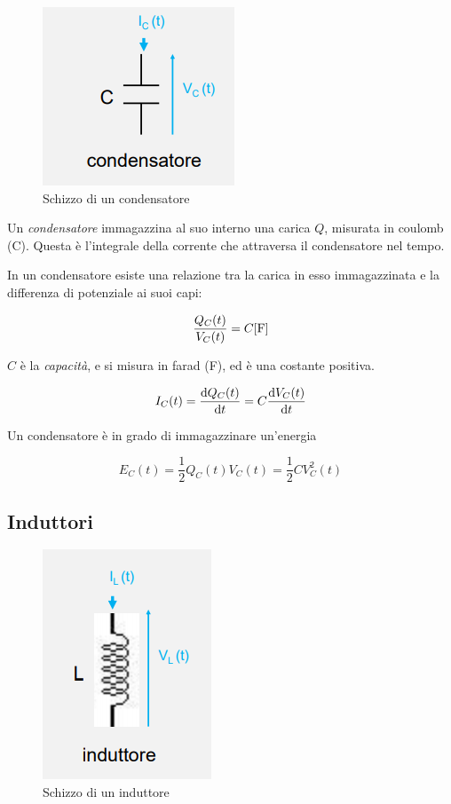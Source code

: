 \documentclass{article}
\begin{document}
\begin{figure}[h!]
  \centering
  \includegraphics[scale=0.65]{IM_condensatore}
  \caption{Schizzo di un condensatore}
  \label{Schema_condensatore}
\end{figure}

Un \textit{condensatore} immagazzina al suo interno una carica $Q$, misurata in coulomb (C). Questa è l'integrale della corrente che attraversa il condensatore nel tempo.

In un condensatore esiste una relazione tra la carica in esso immagazzinata e la differenza di potenziale ai suoi capi:

\[\frac{Q_C (t)}{V_C (t)} = C [\textrm F]\]

$C$ è la \textit{capacità}, e si misura in farad (F), ed è una costante positiva.

\[I_C (t) = \frac{\textrm d Q_C (t)}{\textrm d t} = C \frac{\textrm d V_C (t)}{\textrm d t}\]

Un condensatore è in grado di immagazzinare un'energia

\[E_C (t) = \frac{1}{2} Q_C (t) V_C (t) = \frac{1}{2} C V_C^2 (t)\]










\subsection{Induttori}

\begin{figure}[h]
  \centering
  \includegraphics[scale=0.6]{IM_induttore}
  \caption{Schizzo di un induttore}
  \label{Schema_induttore}
\end{figure}
\end{document}

